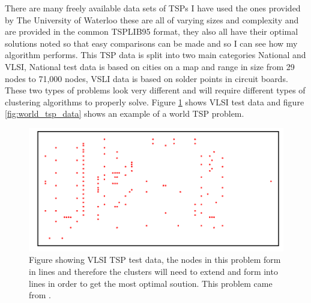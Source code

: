 There are many freely available data sets of TSPs I have used the ones provided by The University of Waterloo\cite{tsp_test_data_2009} these are all of varying sizes and complexity and are provided in the common TSPLIB95 format, they also all have their optimal solutions noted so that easy comparisons can be made and so I can see how my algorithm performs. This TSP data is split into two main categories National and VLSI, National test data is based on cities on a map and range in size from 29 nodes to 71,000 nodes, VSLI data is based on solder points in circuit boards. These two types of problems look very different and will require different types of clustering algorithms to properly solve. Figure \ref{fig:vlsi_tsp_data} shows VLSI test data and figure \ref{fig:world_tsp_data} shows an example of a world TSP problem.

\begin{figure}
    \centering
    \includegraphics[width=\textwidth]{Project Report/LaTeX Template/figures/vlsi_xqf131_tsp_data.png}
    \caption{Figure showing VLSI TSP test data, the nodes in this problem form in lines and therefore the clusters will need to extend and form into lines in order to get the most optimal soution. This problem came from \cite{xqf131_tsp_instance}.}
    \label{fig:vlsi_tsp_data}
\end{figure}

